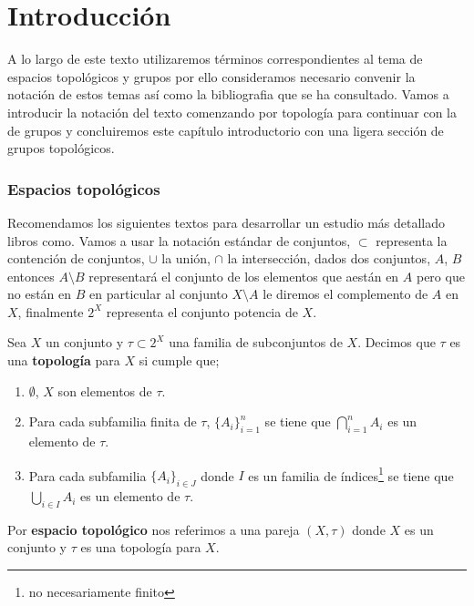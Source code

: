 	

	


	
\chapter{Introducción}

A lo largo de este texto utilizaremos términos correspondientes al tema de espacios topológicos y grupos por ello consideramos necesario convenir la notación de estos temas así como la bibliografia que se ha consultado. Vamos a introducir la notación  del texto comenzando por topología para continuar con la de grupos y concluiremos este capítulo introductorio con una ligera sección de grupos topológicos.

\subsection*{Espacios topológicos}

 Recomendamos los siguientes textos para desarrollar un estudio más detallado libros como. Vamos a usar la notación estándar de conjuntos, $\subset$ representa la contención de conjuntos, $\cup$ la unión, $\cap$ la intersección, dados dos conjuntos, $A$, $B$ entonces $A \setminus B$ representará el conjunto de los elementos que aestán en $A$ pero que no están en $B$ en particular al conjunto $X\setminus A$ le diremos el complemento de $A$ en $X$, finalmente $2^X$ representa el conjunto potencia de $X$. 

\begin{df}
Sea $X$ un conjunto y $\tau \subset 2^X$ una familia de subconjuntos de $X$. Decimos que $\tau$ es una \textbf{topología} para $X$ si cumple que;

	\begin{enumerate}
		\item $\emptyset$, $X$ son elementos de  $\tau.$
		\item Para cada subfamilia finita de $\tau$, $\{A_i\}_{i=1}^n$ se tiene que $\bigcap_{i=1}^n A_i$ es un elemento de $\tau.$ 
		\item Para cada subfamilia $\{A_i\}_{i \in J}$ donde $I$ es un familia de índices\footnote{no necesariamente finito} se tiene que $\bigcup_{i \in I} A_i$ es un elemento de $\tau$.
	\end{enumerate}

Por \textbf{espacio topológico} nos referimos a una pareja $(X,\tau)$ donde $X$ es un conjunto y $\tau$ es una topología para $X$.
\end{df}

